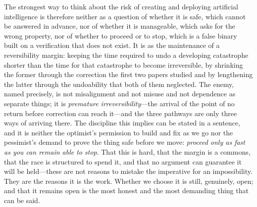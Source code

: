 \documentclass[11pt]{article}
\begin{document}
The strongest way to think about the risk of creating and deploying artificial intelligence is therefore neither as a question of whether it is safe, which cannot be answered in advance, nor of whether it is manageable, which asks for the wrong property, nor of whether to proceed or to stop, which is a false binary built on a verification that does not exist. It is as the maintenance of a reversibility margin: keeping the time required to undo a developing catastrophe shorter than the time for that catastrophe to become irreversible, by shrinking the former through the correction the first two papers studied and by lengthening the latter through the undoability that both of them neglected. The enemy, named precisely, is not misalignment and not misuse and not dependence as separate things; it is \emph{premature irreversibility}---the arrival of the point of no return before correction can reach it---and the three pathways are only three ways of arriving there. The discipline this implies can be stated in a sentence, and it is neither the optimist's permission to build and fix as we go nor the pessimist's demand to prove the thing safe before we move: \emph{proceed only as fast as you can remain able to stop}. That this is hard, that the margin is a commons, that the race is structured to spend it, and that no argument can guarantee it will be held---these are not reasons to mistake the imperative for an impossibility. They are the reasons it is the work. Whether we choose it is still, genuinely, open; and that it remains open is the most honest and the most demanding thing that can be said.
\end{document}
